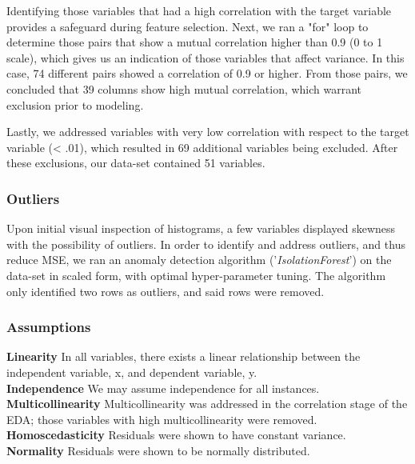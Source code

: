 \documentclass[twoside,twocolumn]{article}
\begin{document}
Identifying those variables that had a high correlation with the target variable provides a safeguard during feature selection. 
Next, we ran a "for" loop to determine those pairs that show a mutual correlation higher than 0.9 (0 to 1 scale), which gives us an indication of those variables that affect variance. In this case, 74 different pairs showed a correlation of 0.9 or higher. From those pairs, we concluded that 39 columns show high mutual correlation, which warrant exclusion prior to modeling. 

Lastly, we addressed variables with very low correlation with respect to the target variable (< .01), which resulted in 69 additional variables being excluded. After these exclusions, our data-set contained 51 variables.

\subsubsection{Outliers}
Upon initial visual inspection of histograms, a few variables displayed skewness with the possibility of outliers. In order to identify and address outliers, and thus reduce MSE, we ran an anomaly detection algorithm ('\emph{IsolationForest}') on the data-set in scaled form, with optimal hyper-parameter tuning. The algorithm only identified two rows as outliers, and said rows were removed.

\subsubsection{Assumptions}
\textbf{Linearity}\newline
In all variables, there exists a linear relationship between the independent variable, x, and dependent variable, y.\newline
\\
\textbf{Independence}\newline
We may assume independence for all instances.\newline
\\
\textbf{Multicollinearity}\newline
Multicollinearity was addressed in the correlation stage of the EDA; those variables with high multicollinearity were removed.\newline
\\
\textbf{Homoscedasticity}\newline
Residuals were shown to have constant variance.\newline
\\
\textbf{Normality}\newline
Residuals were shown to be normally distributed.
\end{document}
